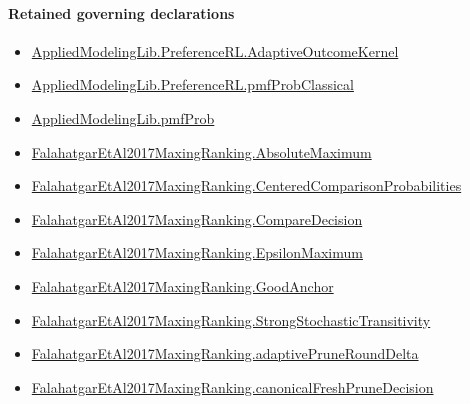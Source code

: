 \documentclass[10pt]{article}
\begin{document}
\paragraph{Retained governing declarations}
\begin{itemize}\raggedright
\item \hyperlink{governing-declaration-1bbfda940769438f}{Applied\allowbreak{}Modeling\allowbreak{}Lib.\allowbreak{}Preference\allowbreak{}RL.\allowbreak{}Adaptive\allowbreak{}Outcome\allowbreak{}Kernel}
\item \hyperlink{governing-declaration-7adb8ad5ca0d515c}{Applied\allowbreak{}Modeling\allowbreak{}Lib.\allowbreak{}Preference\allowbreak{}RL.\allowbreak{}pmf\allowbreak{}Prob\allowbreak{}Classical}
\item \hyperlink{governing-declaration-9c38d53b9d664221}{Applied\allowbreak{}Modeling\allowbreak{}Lib.\allowbreak{}pmf\allowbreak{}Prob}
\item \hyperlink{paper-prerequisite-9c0d6111ba7505a4}{Falahatgar\allowbreak{}Et\allowbreak{}Al2017\allowbreak{}Maxing\allowbreak{}Ranking.\allowbreak{}Absolute\allowbreak{}Maximum}
\item \hyperlink{paper-prerequisite-b99b697ef57f53ce}{Falahatgar\allowbreak{}Et\allowbreak{}Al2017\allowbreak{}Maxing\allowbreak{}Ranking.\allowbreak{}Centered\allowbreak{}Comparison\allowbreak{}Probabilities}
\item \hyperlink{governing-declaration-3723216c72fc3dc8}{Falahatgar\allowbreak{}Et\allowbreak{}Al2017\allowbreak{}Maxing\allowbreak{}Ranking.\allowbreak{}Compare\allowbreak{}Decision}
\item \hyperlink{paper-prerequisite-f40acf814741691d}{Falahatgar\allowbreak{}Et\allowbreak{}Al2017\allowbreak{}Maxing\allowbreak{}Ranking.\allowbreak{}Epsilon\allowbreak{}Maximum}
\item \hyperlink{paper-prerequisite-46128be8e1edb4b6}{Falahatgar\allowbreak{}Et\allowbreak{}Al2017\allowbreak{}Maxing\allowbreak{}Ranking.\allowbreak{}Good\allowbreak{}Anchor}
\item \hyperlink{paper-prerequisite-76807884cf8ad345}{Falahatgar\allowbreak{}Et\allowbreak{}Al2017\allowbreak{}Maxing\allowbreak{}Ranking.\allowbreak{}Strong\allowbreak{}Stochastic\allowbreak{}Transitivity}
\item \hyperlink{governing-declaration-0a2d9c4ad2e46f08}{Falahatgar\allowbreak{}Et\allowbreak{}Al2017\allowbreak{}Maxing\allowbreak{}Ranking.\allowbreak{}adaptive\allowbreak{}Prune\allowbreak{}Round\allowbreak{}Delta}
\item \hyperlink{governing-declaration-5f4aa5a2143dcc9f}{Falahatgar\allowbreak{}Et\allowbreak{}Al2017\allowbreak{}Maxing\allowbreak{}Ranking.\allowbreak{}canonical\allowbreak{}Fresh\allowbreak{}Prune\allowbreak{}Decision}

\end{itemize}
\end{document}
